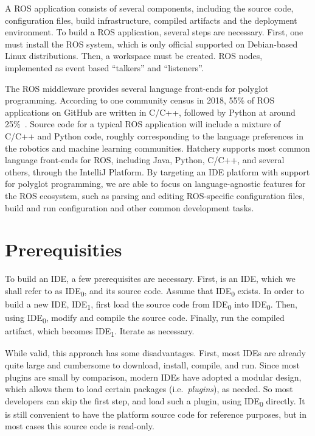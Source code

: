 \documentclass[12pt,initial,twoside,maitrise]{dms}
\numberwithin{equation}{section}
\numberwithin{table}{chapter}
\numberwithin{figure}{chapter}
\begin{document}
A ROS application consists of several components, including the source code, configuration files, build infrastructure, compiled artifacts and the deployment environment. To build a ROS application, several steps are necessary. First, one must install the ROS system, which is only official supported on Debian-based Linux distributions. Then, a workspace must be created. ROS nodes, implemented as event based ``talkers'' and ``listeners''.

The ROS middleware provides several language front-ends for polyglot programming. According to one community census in 2018, 55\% of ROS applications on GitHub are written in C/C++, followed by Python at around 25\%~\citep{Areserio54:online}. Source code for a typical ROS application will include a mixture of C/C++ and Python code, roughly corresponding to the language preferences in the robotics and machine learning communities. Hatchery supports most common language front-ends for ROS, including Java, Python, C/C++, and several others, through the IntelliJ Platform. By targeting an IDE platform with support for polyglot programming, we are able to focus on language-agnostic features for the ROS ecosystem, such as parsing and editing ROS-specific configuration files, build and run configuration and other common development tasks.

\section{Prerequisities}

To build an IDE, a few prerequisites are necessary. First, is an IDE, which we shall refer to as IDE\textsubscript{0}, and its source code. Assume that IDE\textsubscript{0} exists. In order to build a new IDE, IDE\textsubscript{1}, first load the source code from IDE\textsubscript{0} into IDE\textsubscript{0}. Then, using IDE\textsubscript{0}, modify and compile the source code. Finally, run the compiled artifact, which becomes IDE\textsubscript{1}. Iterate as necessary.

While valid, this approach has some disadvantages. First, most IDEs are already quite large and cumbersome to download, install, compile, and run. Since most plugins are small by comparison, modern IDEs have adopted a modular design, which allows them to load certain packages (i.e.\ \textit{plugins}), as needed. So most developers can skip the first step, and load such a plugin, using IDE\textsubscript{0} directly. It is still convenient to have the platform source code for reference purposes, but in most cases this source code is read-only.
\end{document}
